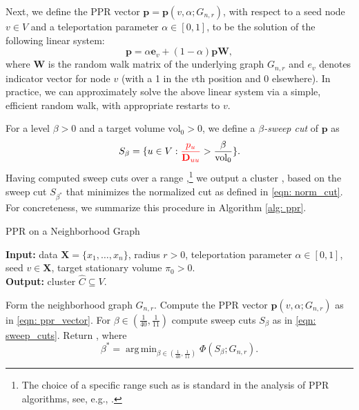 \documentclass{article}
\newcommand{\vol}{\mathrm{vol}}
\newcommand{\1}{\mathbf{1}}
\newcommand{\pbf}{\mathbf{p}}
\newcommand{\ebf}[1]{\mathbf{e}_{#1}}
\newcommand{\Xbf}{\mathbf{X}}
\newcommand{\Wbf}{\mathbf{W}}
\newcommand{\Dbf}{\mathbf{D}}
\DeclareMathOperator*{\argmin}{arg\,min}
\theoremstyle{aldenthm}
\theoremstyle{aldenrmrk}
\begin{document}
Next, we define the PPR vector $\pbf = \pbf(v,\alpha;G_{n,r})$, with respect to  
a seed node $v \in V$ and a teleportation parameter $\alpha \in [0,1]$, to be
the solution of the following linear system:
\begin{equation}
\label{eqn: ppr_vector}
\pbf = \alpha \ebf{v} + (1 - \alpha) \pbf \Wbf,
\end{equation}
where $\Wbf$ is the random walk matrix of the underlying graph $G_{n,r}$ 
and $e_{v}$ denotes indicator vector for node $v$ (with a 1 in the $v$th
position and 0 elsewhere).  In practice, we can approximately solve the above
linear system via a simple, efficient random walk, with appropriate restarts to
$v$. 

For a level $\beta > 0$ and a target volume $\vol_0 > 0$, we define a
\emph{$\beta$-sweep cut} of $\pbf$ as  
\begin{equation}
\label{eqn: sweep_cuts}
S_\beta = \{u \in V: \textcolor{red}{\frac{p_u}{\Dbf_{uu}}} > \frac{\beta}{\vol_{0}}\}.
\end{equation}
Having computed sweep cuts over a range ,\footnote{The choice of a specific range such as 
 is standard in the analysis of PPR
algorithms, see, e.g., \citep{zhu2013}.}
we output a cluster , based on the sweep cut
$S_{\beta^*}$ that minimizes the normalized cut  as defined in \eqref{eqn: norm_cut}. For concreteness, we summarize
this procedure in Algorithm \ref{alg: ppr}.   

\begin{algorithm}
\caption{PPR on a Neighborhood Graph}
\label{alg: ppr}	
{\bfseries Input:} data $\Xbf=\{x_1,\ldots,x_n\}$, radius $r > 0$, teleportation 
parameter $\alpha \in [0,1]$, seed $v \in \Xbf$, target stationary volume $\pi_0 >
0$. \\   
{\bfseries Output:} cluster $\widehat{C} \subseteq V$.
\begin{algorithmic}[1]
  \STATE Form the neighborhood graph $G_{n,r}$.
  \STATE Compute the PPR vector $\pbf(v, \alpha; G_{n,r})$ as in \eqref{eqn:
    ppr_vector}. 
  \STATE For $\beta \in (\frac{1}{40}, \frac{1}{11})$ compute sweep cuts
  $S_{\beta}$ as in \eqref{eqn: sweep_cuts}.
  \STATE Return , where 
  $$
  \beta^* = \argmin_{\beta \in (\frac{1}{40}, \frac{1}{11})} \Phi(S_{\beta}; G_{n,r}).
  $$
\end{algorithmic}
\end{algorithm}
\end{document}
